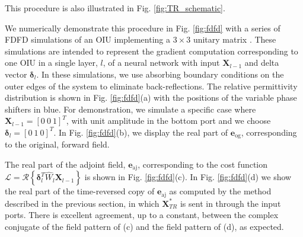

This procedure is also illustrated in Fig. \ref{fig:TR_schematic}.

We numerically demonstrate this procedure in Fig. \ref{fig:fdfd} with a series of FDFD simulations of an OIU implementing a $3 \times 3$ unitary matrix \cite{Reck1994}. These simulations are intended to represent the gradient computation corresponding to one OIU in a single layer, $l$, of a neural network with input $\mathbf{X}_{l-1}$ and delta vector $\boldsymbol{\delta}_l$. In these simulations, we use absorbing boundary conditions on the outer edges of the system to eliminate back-reflections.  The relative permittivity distribution is shown in Fig. \ref{fig:fdfd}(a) with the positions of the variable phase shifters in blue.  For demonstration, we simulate a specific case where $\mathbf{X}_{l-1} = [0~0~1]^T$, with unit amplitude in the bottom port and we choose $\boldsymbol{\delta}_l = [0~1~0]^T$.  In Fig. \ref{fig:fdfd}(b), we display the real part of $\textbf{e}_\textrm{og}$, corresponding to the original, forward field.  

The real part of the adjoint field, $\textbf{e}_\textrm{aj}$, corresponding to the cost function $\mathcal{L} = \mathcal{R}\left\{\boldsymbol{\delta}_l^T \hat{W}_l \mathbf{X}_{l-1} \right\}$ is shown in Fig. \ref{fig:fdfd}(c).  In Fig. \ref{fig:fdfd}(d) we show the real part of the time-reversed copy of $\textbf{e}_\textrm{aj}$ as computed by the method described in the previous section, in which $\mathbf{X}^*_{TR}$ is sent in through the input ports.  There is excellent agreement, up to a constant, between the complex conjugate of the field pattern of (c) and the field pattern of (d), as expected.  


